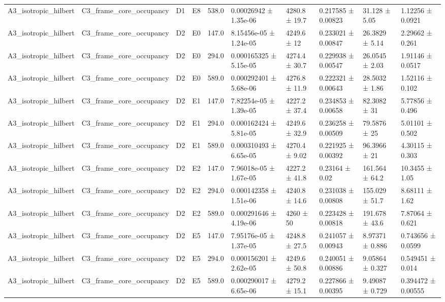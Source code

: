 \begin{table}
\begin{tabular}{llllllllll}
A3\_isotropic\_hilbert & C3\_frame\_core\_occupancy & D1 & E8 & 538.0 & 0.00026942 ± 1.35e-06 & 4280.8 ± 19.7 & 0.217585 ± 0.00823 & 31.128 ± 5.05 & 1.12256 ± 0.0921 \\
A3\_isotropic\_hilbert & C3\_frame\_core\_occupancy & D2 & E0 & 147.0 & 8.15456e-05 ± 1.24e-05 & 4249.6 ± 12 & 0.233021 ± 0.00847 & 26.3829 ± 5.14 & 2.29662 ± 0.261 \\
A3\_isotropic\_hilbert & C3\_frame\_core\_occupancy & D2 & E0 & 294.0 & 0.000165325 ± 5.15e-05 & 4274.4 ± 30.7 & 0.229938 ± 0.00547 & 26.0545 ± 2.03 & 1.91146 ± 0.0517 \\
A3\_isotropic\_hilbert & C3\_frame\_core\_occupancy & D2 & E0 & 589.0 & 0.000292401 ± 5.68e-06 & 4276.8 ± 11.9 & 0.222321 ± 0.00643 & 28.5032 ± 1.86 & 1.52116 ± 0.102 \\
A3\_isotropic\_hilbert & C3\_frame\_core\_occupancy & D2 & E1 & 147.0 & 7.82254e-05 ± 1.39e-05 & 4227.2 ± 37.4 & 0.234853 ± 0.00658 & 82.3082 ± 31 & 5.77856 ± 0.496 \\
A3\_isotropic\_hilbert & C3\_frame\_core\_occupancy & D2 & E1 & 294.0 & 0.000162424 ± 5.81e-05 & 4249.6 ± 32.9 & 0.236258 ± 0.00509 & 79.5876 ± 25 & 5.01101 ± 0.502 \\
A3\_isotropic\_hilbert & C3\_frame\_core\_occupancy & D2 & E1 & 589.0 & 0.000310493 ± 6.65e-05 & 4270.4 ± 9.02 & 0.221925 ± 0.00392 & 96.3966 ± 21 & 4.30115 ± 0.303 \\
A3\_isotropic\_hilbert & C3\_frame\_core\_occupancy & D2 & E2 & 147.0 & 7.96018e-05 ± 1.67e-05 & 4227.2 ± 41.8 & 0.23164 ± 0.02 & 161.564 ± 64.2 & 10.3455 ± 1.05 \\
A3\_isotropic\_hilbert & C3\_frame\_core\_occupancy & D2 & E2 & 294.0 & 0.000142358 ± 1.51e-06 & 4240.8 ± 14.6 & 0.231038 ± 0.00808 & 155.029 ± 51.7 & 8.68111 ± 1.62 \\
A3\_isotropic\_hilbert & C3\_frame\_core\_occupancy & D2 & E2 & 589.0 & 0.000291646 ± 4.19e-06 & 4260 ± 50 & 0.223428 ± 0.00818 & 191.678 ± 43.6 & 7.87064 ± 0.621 \\
A3\_isotropic\_hilbert & C3\_frame\_core\_occupancy & D2 & E5 & 147.0 & 7.95176e-05 ± 1.37e-05 & 4248.8 ± 27.5 & 0.241057 ± 0.00943 & 8.97371 ± 0.886 & 0.743656 ± 0.0599 \\
A3\_isotropic\_hilbert & C3\_frame\_core\_occupancy & D2 & E5 & 294.0 & 0.000156201 ± 2.62e-05 & 4249.6 ± 50.8 & 0.240051 ± 0.00886 & 9.05864 ± 0.327 & 0.549451 ± 0.014 \\
A3\_isotropic\_hilbert & C3\_frame\_core\_occupancy & D2 & E5 & 589.0 & 0.000290017 ± 6.65e-06 & 4279.2 ± 15.1 & 0.227866 ± 0.00395 & 9.49087 ± 0.729 & 0.394472 ± 0.00555 \\

\end{tabular}
\end{table}
